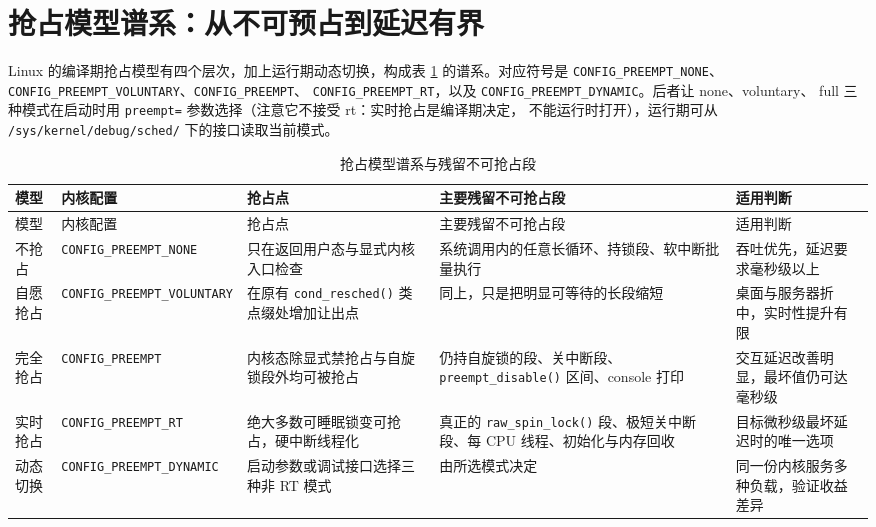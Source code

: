 \documentclass[12pt,a4paper,fontset=fandol]{ctexbook}
\newcommand{\Fn}[1]{\texttt{#1()}}
\newcommand{\Tp}[1]{\texttt{#1}}
\newcommand{\Bk}{\discretionary{}{}{}}
\begin{document}
\section{抢占模型谱系：从不可预占到延迟有界}
\label{sec:ch08-preempt-models}

Linux 的编译期抢占模型有四个层次，加上运行期动态切换，构成表
\ref{tab:ch08-preempt-models} 的谱系。对应符号是
\Tp{CONFIG\_{\Bk}PREEMPT\_{\Bk}NONE}、\Tp{CONFIG\_{\Bk}PREEMPT\_{\Bk}VOLUNTARY}、\Tp{CONFIG\_{\Bk}PREEMPT}、
\Tp{CONFIG\_{\Bk}PREEMPT\_{\Bk}RT}，以及 \Tp{CONFIG\_{\Bk}PREEMPT\_{\Bk}DYNAMIC}。后者让 none、voluntary、
full 三种模式在启动时用 \Tp{preempt=} 参数选择（注意它不接受 rt：实时抢占是编译期决定，
不能运行时打开），运行期可从 \Tp{/sys/kernel/debug/sched/} 下的接口读取当前模式。

\begin{longtable}{>{\raggedright\arraybackslash}p{}
                  >{\raggedright\arraybackslash}p{}
                  >{\raggedright\arraybackslash}p{}
                  >{\raggedright\arraybackslash}p{}
                  >{\raggedright\arraybackslash}p{}}
\caption{抢占模型谱系与残留不可抢占段}\label{tab:ch08-preempt-models}\\
\toprule
模型 & 内核配置 & 抢占点 & 主要残留不可抢占段 & 适用判断 \\
\midrule
\endfirsthead
\toprule
模型 & 内核配置 & 抢占点 & 主要残留不可抢占段 & 适用判断 \\
\midrule
\endhead
\bottomrule
\endfoot
\endlastfoot
不抢占 & \Tp{CONFIG\_{\Bk}PREEMPT\_{\Bk}NONE} & 只在返回用户态与显式内核入口检查 & 系统调用内的任意长循环、持锁段、软中断批量执行 & 吞吐优先，延迟要求毫秒级以上 \\
自愿抢占 & \Tp{CONFIG\_{\Bk}PREEMPT\_{\Bk}VOLUNTARY} & 在原有 \Fn{cond\_{\Bk}resched} 类点缀处增加让出点 & 同上，只是把明显可等待的长段缩短 & 桌面与服务器折中，实时性提升有限 \\
完全抢占 & \Tp{CONFIG\_{\Bk}PREEMPT} & 内核态除显式禁抢占与自旋锁段外均可被抢占 & 仍持自旋锁的段、关中断段、\Fn{preempt\_{\Bk}disable} 区间、console 打印 & 交互延迟改善明显，最坏值仍可达毫秒级 \\
实时抢占 & \Tp{CONFIG\_{\Bk}PREEMPT\_{\Bk}RT} & 绝大多数可睡眠锁变可抢占，硬中断线程化 & 真正的 \Fn{raw\_{\Bk}spin\_{\Bk}lock} 段、极短关中断段、每 CPU 线程、初始化与内存回收 & 目标微秒级最坏延迟时的唯一选项 \\
动态切换 & \Tp{CONFIG\_{\Bk}PREEMPT\_{\Bk}DYNAMIC} & 启动参数或调试接口选择三种非 RT 模式 & 由所选模式决定 & 同一份内核服务多种负载，验证收益差异 \\
\end{longtable}
\end{document}
